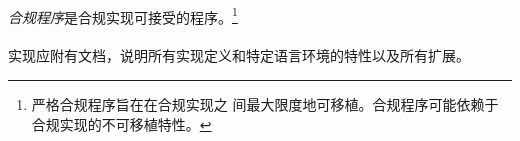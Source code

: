 \paragraph{}
\textit{合规程序}是合规实现可接受的程序。\footnote{严格合规程序旨在在合规实现之
间最大限度地可移植。合规程序可能依赖于合规实现的不可移植特性。}

\paragraph{}
实现应附有文档，说明所有实现定义和特定语言环境的特性以及所有扩展。

